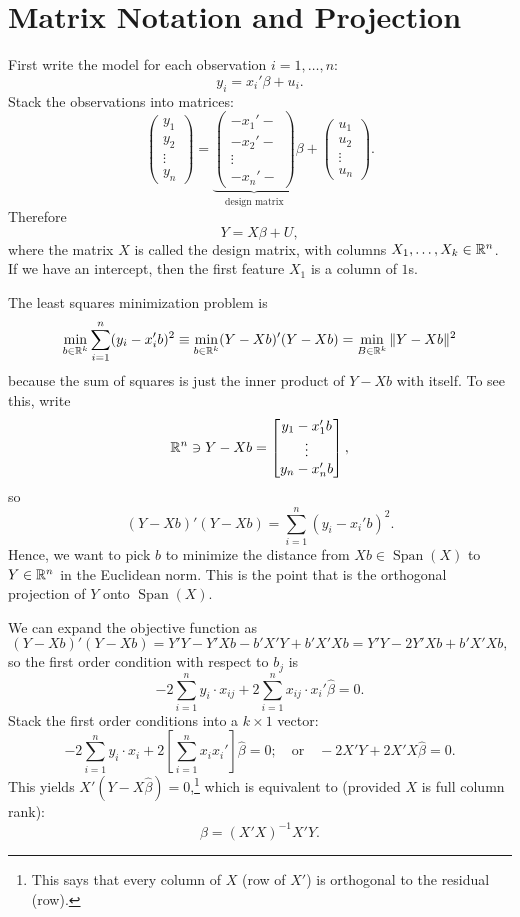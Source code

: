 \section{Matrix Notation and Projection}

\begin{remark}
	First write the model for each observation $i=1,\ldots,n$:
	\[
		y_i=x_i'\beta+u_i.
	\]
	Stack the observations into matrices:
	\[
		\begin{pmatrix}
			y_1    \\
			y_2    \\
			\vdots \\
			y_n
		\end{pmatrix}
		=
		\underbrace{\begin{pmatrix}
			-x_1'- \\
			-x_2'- \\
			\vdots \\
			-x_n'-
		\end{pmatrix}}_{\text{design matrix}}
		\beta
		+
		\begin{pmatrix}
			u_1    \\
			u_2    \\
			\vdots \\
			u_n
		\end{pmatrix}.
	\]
	Therefore
	\[
		Y=X\beta+U,
	\]
	where the matrix $X$ is called the design matrix, with columns $X_1,\ldots,X_k\in\mathbb{R}^n$. If we have an intercept, then the first feature $X_1$ is a column of $1$s.

	The least squares minimization problem is
	\[
		\min_{b\in\mathbb{R}^k}\sum_{i=1}^n(y_i-x_i'b)^2\equiv\min_{b\in\mathbb{R}^k}(Y-Xb)'(Y-Xb) = \min_{B \in \mathbb{R}^k} \|Y - Xb\|^2
	\]
	because the sum of squares is just the inner product of $Y-Xb$ with itself.
	To see this, write \[
		\mathbb{R}^n \ni Y - Xb = \begin{bmatrix}
		y_1-x_1'b \\
		\vdots \\
		y_n - x_n'b
		\end{bmatrix} 
	,\] so \[
	\left( Y-Xb \right)'(Y-Xb) = \sum\limits_{i=1}^{n} \left( y_i - x_i'b \right)^2
	.\] Hence, we want to pick $b$ to minimize the distance from $Xb \in \operatorname{Span}(X)$ to $Y\in \mathbb{R}^n$ in the Euclidean norm. This is the point that is the orthogonal projection of $Y$ onto $\operatorname{Span}(X)$.

	We can expand the objective function as
	\[
		(Y-Xb)'(Y-Xb)=Y'Y-Y'Xb-b'X'Y+b'X'Xb=Y'Y-2Y'Xb+b'X'Xb,
	\]
	so the first order condition with respect to $b_j$ is
	\[
		-2\sum_{i=1}^n y_i\cdot x_{ij}+2\sum_{i=1}^n x_{ij}\cdot x_i'\hat\beta=0.
	\]
	Stack the first order conditions into a $k\times 1$ vector:
	\[
		-2\sum_{i=1}^n y_i\cdot x_i+2\left[\sum_{i=1}^n x_ix_i'\right]\hat\beta=0;\quad\text{or}\quad
		-2X'Y+2X'X\hat\beta=0.
	\]
	This yields $X'\left( Y- X\hat{\beta} \right) = 0$,\footnote{This says that every column of $X$ (row of $X'$) is orthogonal to the residual (row).} which is equivalent to (provided $X$ is full column rank):
	\[
		\hat\beta=(X'X)^{-1}X'Y.
	\]
\end{remark}

